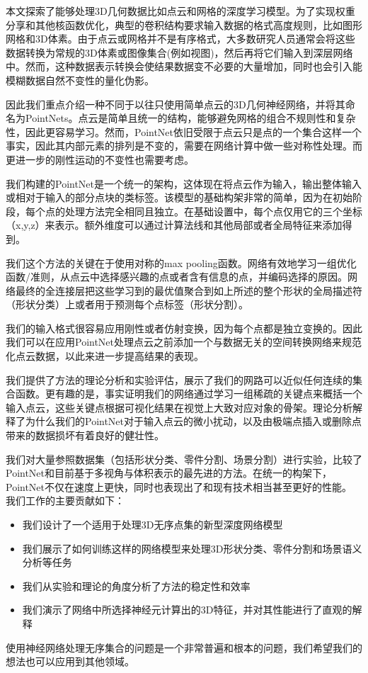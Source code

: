 \label{sec:intro}


本文探索了能够处理3D几何数据比如点云和网格的深度学习模型。为了实现权重分享和其他核函数优化，典型的卷积结构要求输入数据的格式高度规则，比如图形网格和3D体素。由于点云或网格并不是有序格式，大多数研究人员通常会将这些数据转换为常规的3D体素或图像集合(例如视图)，然后再将它们输入到深层网络中。然而，这种数据表示转换会使结果数据变不必要的大量增加，同时也会引入能模糊数据自然不变性的量化伪影。

因此我们重点介绍一种不同于以往只使用简单点云的3D几何神经网络，并将其命名为PointNets。点云是简单且统一的结构，能够避免网格的组合不规则性和复杂性，因此更容易学习。然而，PointNet依旧受限于点云只是点的一个集合这样一个事实，因此其内部元素的排列是不变的，需要在网络计算中做一些对称性处理。而更进一步的刚性运动的不变性也需要考虑。

我们构建的PointNet是一个统一的架构，这体现在将点云作为输入，输出整体输入或相对于输入的部分点块的类标签。该模型的基础构架非常的简单，因为在初始阶段，每个点的处理方法完全相同且独立。在基础设置中，每个点仅用它的三个坐标（x,y,z）来表示。额外维度可以通过计算法线和其他局部或者全局特征来添加得到。

我们这个方法的关键在于使用对称的max pooling函数。网络有效地学习一组优化函数/准则，从点云中选择感兴趣的点或者含有信息的点，并编码选择的原因。网络最终的全连接层把这些学习到的最优值聚合到如上所述的整个形状的全局描述符（形状分类）上或者用于预测每个点标签（形状分割）。

我们的输入格式很容易应用刚性或者仿射变换，因为每个点都是独立变换的。因此我们可以在应用PointNet处理点云之前添加一个与数据无关的空间转换网络来规范化点云数据，以此来进一步提高结果的表现。

我们提供了方法的理论分析和实验评估，展示了我们的网路可以近似任何连续的集合函数。更有趣的是，事实证明我们的网络通过学习一组稀疏的关键点来概括一个输入点云，这些关键点根据可视化结果在视觉上大致对应对象的骨架。理论分析解释了为什么我们的PointNet对于输入点云的微小扰动，以及由极端点插入或删除点带来的数据损坏有着良好的健壮性。

我们对大量参照数据集（包括形状分类、零件分割、场景分割）进行实验，比较了PointNet和目前基于多视角与体积表示的最先进的方法。在统一的构架下，PointNet不仅在速度上更快，同时也表现出了和现有技术相当甚至更好的性能。
我们工作的主要贡献如下：
\begin{itemize}
    \item 我们设计了一个适用于处理3D无序点集的新型深度网络模型
    \item 我们展示了如何训练这样的网络模型来处理3D形状分类、零件分割和场景语义分析等任务
    \item 我们从实验和理论的角度分析了方法的稳定性和效率
    \item 我们演示了网络中所选择神经元计算出的3D特征，并对其性能进行了直观的解释
    
\end{itemize}
使用神经网络处理无序集合的问题是一个非常普遍和根本的问题，我们希望我们的想法也可以应用到其他领域。


